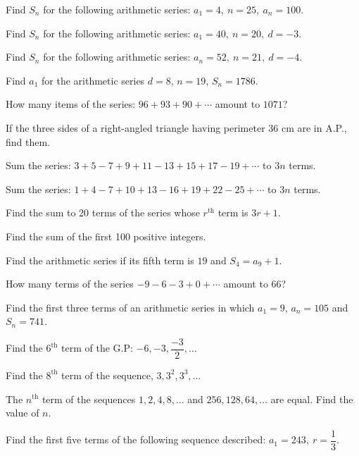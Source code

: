 \documentclass[11pt,a4paper]{article}
\begin{document}
\begin{shortlist}
\item Find $S_n$ for the following arithmetic series: $a_1=4,\ n=25,\ a_n=100$.

\item Find $S_n$ for the following arithmetic series: $a_1=40,\ n=20,\ d=-3$.

\item Find $S_n$ for the following arithmetic series: $a_n=52,\ n=21,\ d=-4$.

\item Find $a_1$ for the arithmetic series $d=8$, $n=19$, $S_n=1786$.

\item How many items of the series: $96+93+90+\cdots$ amount to $1071$?

\item If the three sides of a right-angled triangle having perimeter 36 cm are in A.P., find them.

\item Sum the series: $3+5-7+9+11-13+15+17-19+\cdots$ to $3n$ terms.

\item Sum the series: $1+4-7+10+13-16+19+22-25+\cdots$ to $3n$ terms.

\item Find the sum to 20 terms of the series whose $r^{\text{th}}$ term is $3r+1$.

\item Find the sum of the first 100 positive integers.

\item Find the arithmetic series if its fifth term is $19$ and $S_4=a_9+1$.

\item How many terms of the series $-9-6-3+0+\cdots$ amount to $66$?

\item Find the first three terms of an arithmetic series in which $a_1=9$, $a_n=105$ and $S_n=741$.

\item Find the $6^{\text{th}}$ term of the G.P: $-6,-3,\dfrac{-3}{2},\ldots$

\item Find the $8^{\text{th}}$ term of the sequence, $3,3^2,3^3,\ldots$

\item The $n^{\text{th}}$ term of the sequences $1,2,4,8,\ldots$ and $256,128,64,\ldots$ are equal. Find the value of $n$.

\item Find the first five terms of the following sequence described: $a_1=243,\ r=\dfrac{1}{3}$.


\end{shortlist}
\end{document}
